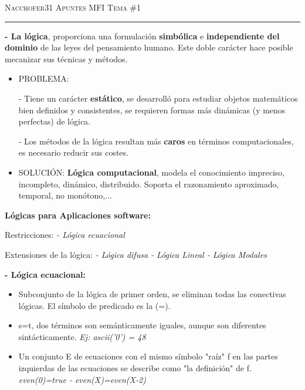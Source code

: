 \documentclass[12pt]{amsart}
\begin{document}
    \thispagestyle{empty}
    {\scshape Nacchofer31} \hfill {\scshape \large Apuntes MFI} \hfill {\scshape Tema \#1}
     
    \hrule
    \medskip
    
    \textbf{- La lógica}, proporciona una formulación \textbf{simbólica} e \textbf{independiente del dominio} de las leyes del pensamiento humano.
    Este doble carácter hace posible mecanizar sus técnicas y métodos. 
    
    \begin{itemize}
    
    \item  PROBLEMA: 
    
    - Tiene un carácter \textbf{estático}, se desarrolló para estudiar objetos matemáticos  bien definidos y consistentes, se requieren
    formas más dinámicas (y menos perfectas) de lógica. 
    
    - Los métodos de la lógica resultan más \textbf{caros} en términos computacionales, es necesario reducir sus costes.
    \item  SOLUCIÓN: \textbf{Lógica computacional}, modela el conocimiento impreciso, incompleto, dinámico, distribuido. 
    Soporta el razonamiento aproximado, temporal, no monótono,...
    
    
    \end{itemize}
    
    \textbf{Lógicas para Aplicaciones software:}

    
    
    Restricciones: \emph{- Lógica ecuacional}
    
    Extensiones de la lógica: \emph{- Lógica difusa - Lógica Lineal - Lógica
    Modales}

    \textbf{- Lógica ecuacional:}
    
    \begin{itemize}
    
    \item  Subconjunto de la lógica de primer orden,
     se eliminan todas las conectivas lógicas. El símbolo de predicado
     es la (=).
    \item s=t, dos términos son semánticamente iguales, aunque son diferentes
     sintácticamente. \emph{Ej: ascii('0') = 48}
    \item Un conjunto E de ecuaciones con el mismo símbolo "raíz" f
    en las partes izquierdas de las ecuaciones se describe como
    "la definición" de f. \emph{even(0)=true - even(X)=even(X-2)}
    
    \end{itemize}
    
\end{document}
